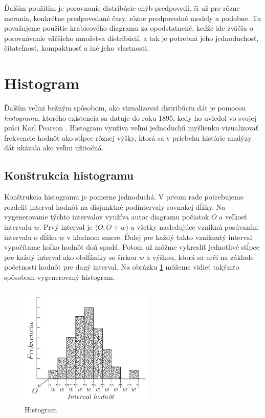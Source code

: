 Ďalším použitím je porovnanie distribúcie chýb predpovedí, či už pre rôzne merania, konkrétne predpovedané časy, rôzne predpovedné modely a podobne. Tu považujeme použitie krabicového diagramu za opodstatnené, keďže ide zväčša o porovnávanie väčšieho množstva distribúcií, a tak je potrebná jeho jednoduchosť, čitateľnosť, kompaktnosť a iné jeho vlastnosti.

\section{Histogram}
\label{sec:histogram}
Ďalším veľmi bežným spôsobom, ako vizualizovať distribúciu dát je pomocou \textit{histogramu}, ktorého existencia sa datuje do roku 1895, kedy ho uviedol vo svojej práci Karl Pearson \cite{histogram}. Histogram využíva veľmi jednoduchú myšlienku vizualizovať frekvencie hodnôt ako stĺpce rôznej výšky, ktorá sa v priebehu histórie analýzy dát ukázala ako veľmi užitočná.

\subsection{Konštrukcia histogramu}
Konštrukcia histogramu je pomerne jednoduchá. V prvom rade potrebujeme rozdeliť interval hodnôt na disjunktné podintervaly rovnakej dĺžky. Na vygenerovanie týchto intervalov využíva autor diagramu počiatok $ O $ a veľkosť intervalu $ w $. Prvý interval je $ \langle O, O + w) $ a všetky nasledujúce vzniknú posúvaním intervalu o dĺžku $ w $ v kladnom smere. Ďalej pre každý takto vzniknutý interval vypočítame koľko hodnôt doň spadá. Potom už môžme vykresliť jednotlivé stĺpce pre každý interval ako obdĺžniky so šírkou $ w $ a výškou, ktorá sa určí na základe početnosti hodnôt pre daný interval. Na obrázku \ref{fig:histogram} môžeme vidieť takýmto spôsobom vygenerovaný histogram.

\begin{figure}
	\centering
	\includegraphics[width = 2.5in]{histogram}
	\caption{ Histogram }
	\label{fig:histogram}
\end{figure}

